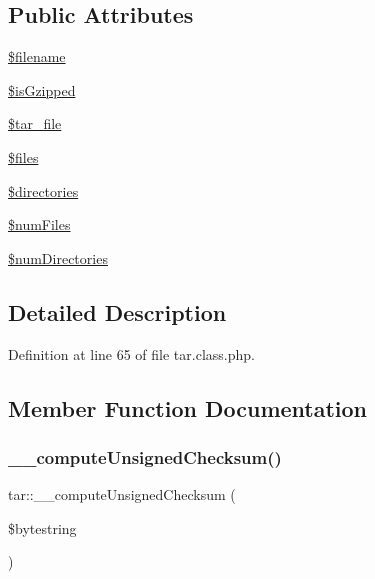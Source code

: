 \subsection*{Public Attributes}
\begin{DoxyCompactItemize}
\item 
\hyperlink{classtar_af99384023359a00770ca0ffb858b21fb}{\$filename}
\item 
\hyperlink{classtar_a82771381c948bca4c166212276fe4b46}{\$is\+Gzipped}
\item 
\hyperlink{classtar_afea782413237d583b7611a1c5410f2c5}{\$tar\+\_\+file}
\item 
\hyperlink{classtar_a2082ab6894219b27e42024e925c4e11f}{\$files}
\item 
\hyperlink{classtar_a03d6b15a492e4917989d2577372dcb58}{\$directories}
\item 
\hyperlink{classtar_a03d688d94a5fa92720ff9b1c03e7c157}{\$num\+Files}
\item 
\hyperlink{classtar_a2406f376692c41ad3e3a62cf473738ec}{\$num\+Directories}
\end{DoxyCompactItemize}


\subsection{Detailed Description}


Definition at line 65 of file tar.\+class.\+php.



\subsection{Member Function Documentation}
\mbox{\label{classtar_a2f9a99c49a3ab86475a1cd26e722c0fa}} 
\subsubsection{\texorpdfstring{\+\_\+\+\_\+compute\+Unsigned\+Checksum()}{\_\_computeUnsignedChecksum()}}
{\footnotesize\ttfamily tar\+::\+\_\+\+\_\+compute\+Unsigned\+Checksum (\begin{DoxyParamCaption}\item[{}]{\$bytestring }\end{DoxyParamCaption})}



